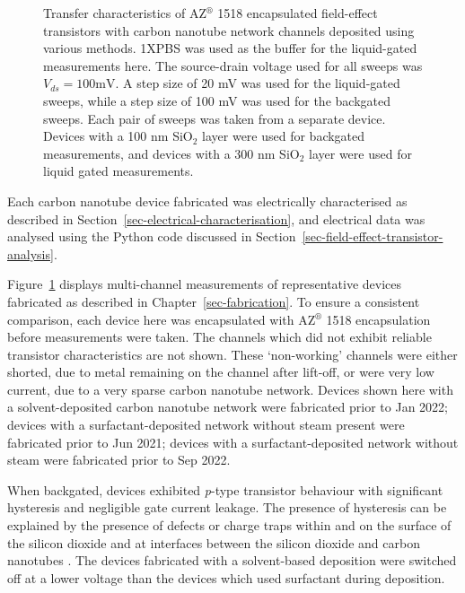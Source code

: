\documentclass[
  a4paper,
]{scrbook}
\begin{document}
\begin{figure}
\begin{minipage}[t]{0.49\linewidth}
{{}

}

\end{minipage}%

\caption{\label{fig-pristine-cnt-characteristics}Transfer
characteristics of AZ\(^\circledR\) 1518 encapsulated field-effect
transistors with carbon nanotube network channels deposited using
various methods. 1XPBS was used as the buffer for the liquid-gated
measurements here. The source-drain voltage used for all sweeps was
\(V_{ds} = 100 \textrm{mV}\). A step size of 20 mV was used for the
liquid-gated sweeps, while a step size of 100 mV was used for the
backgated sweeps. Each pair of sweeps was taken from a separate device.
Devices with a 100 nm SiO\(_2\) layer were used for backgated
measurements, and devices with a 300 nm SiO\(_2\) layer were used for
liquid gated measurements.}

\end{figure}

Each carbon nanotube device fabricated was electrically characterised as
described in Section~\ref{sec-electrical-characterisation}, and
electrical data was analysed using the Python code discussed in
Section~\ref{sec-field-effect-transistor-analysis}.

Figure~\ref{fig-pristine-cnt-characteristics} displays multi-channel
measurements of representative devices fabricated as described in
Chapter~\ref{sec-fabrication}. To ensure a consistent comparison, each
device here was encapsulated with AZ\(^\circledR\) 1518 encapsulation
before measurements were taken. The channels which did not exhibit
reliable transistor characteristics are not shown. These `non-working'
channels were either shorted, due to metal remaining on the channel
after lift-off, or were very low current, due to a very sparse carbon
nanotube network. Devices shown here with a solvent-deposited carbon
nanotube network were fabricated prior to Jan 2022; devices with a
surfactant-deposited network without steam present were fabricated prior
to Jun 2021; devices with a surfactant-deposited network without steam
were fabricated prior to Sep 2022.

When backgated, devices exhibited \emph{p}-type transistor behaviour
with significant hysteresis and negligible gate current leakage. The
presence of hysteresis can be explained by the presence of defects or
charge traps within and on the surface of the silicon dioxide and at
interfaces between the silicon dioxide and carbon nanotubes
\autocite{Lee2007,Lee2012,Ha2014}. The devices fabricated with a
solvent-based deposition were switched off at a lower voltage than the
devices which used surfactant during deposition.
\end{document}
